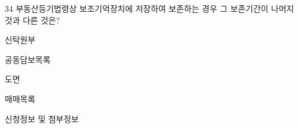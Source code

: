 \begin{question}{34}
부동산등기법령상 보조기억장치에 저장하여 보존하는 경우 그 보존기간이 나머지 것과 다른 것은?
\begin{choices}
  \item 신탁원부
  \item 공동담보목록
  \item 도면
  \item 매매목록
  \item 신청정보 및 첨부정보
\end{choices}
\end{question}
